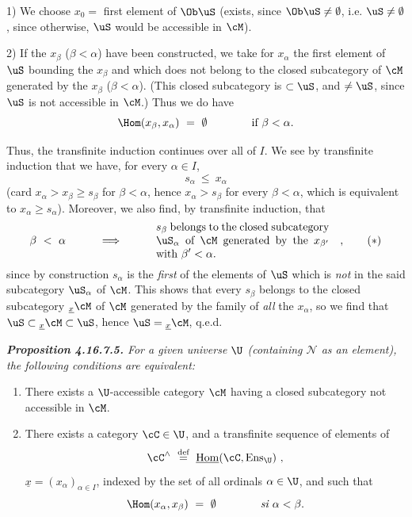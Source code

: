 1) We choose $x_0 =$ first element of $\Ob \uS$ (exists, since $\Ob \uS \neq \emptyset$, i.e. $\uS \neq \emptyset$, since otherwise, $\uS$ would be accessible in $\cM$).

2) If the $x_\beta$ ($\beta < \alpha$) have been constructed, we take for $x_\alpha$ the first element of $\uS$ bounding the $x_\beta$ and which does not belong to the closed subcategory of $\cM$ generated by the $x_\beta$ ($\beta < \alpha$). (This closed subcategory is $\subset \uS$, and $\neq \uS$, since $\uS$ is not accessible in $\cM$.) Thus we do have
\[
\Hom(x_\beta, x_\alpha) \ =\ \emptyset \qquad\qquad \text{if } \beta < \alpha.
\]


Thus, the transfinite induction continues over all of $I$. We see by transfinite induction that we have, for every $\alpha \in I$,
\[
s_\alpha \ \leqslant\ x_\alpha
\]
(card $x_\alpha > x_\beta \geqslant s_\beta$ for $\beta < \alpha$, hence $x_\alpha > s_\beta$ for every $\beta < \alpha$, which is equivalent to $x_\alpha \geqslant s_\alpha$). Moreover, we also find, by transfinite induction, that
\[
\beta \ <\ \alpha \qquad\quad \Longrightarrow \qquad\quad
\text{\parbox[c]{5.5cm}{$s_\beta$ belongs to the closed subcategory $\uS_\alpha$ of $\cM$ generated by the $x_{\beta'}$ with $\beta' < \alpha$.}}
\quad ,
\tag*{$(*)$}
\]
since by construction $s_\alpha$ is the \textit{first} of the elements of $\uS$ which is \textit{not} in the said subcategory $\uS_\alpha$ of $\cM$. This shows that every $s_\beta$ belongs to the closed subcategory ${}_{\underline{x}}\cM$ of $\cM$ generated by the family of \textit{all} the $x_\alpha$, so we find that $\uS \subset {}_{\underline{x}}\cM \subset \uS$, hence $\uS = {}_{\underline{x}}\cM$, q.e.d.

\begingroup\itshape
\noindent\textbf{\upshape Proposition 4.16.7.5.} For a given universe $\U$ (containing $\mathcal{N}$ as an element), the following conditions are equivalent:
\begin{enumerate}[label={}]
\item[1)] There exists a $\U$-accessible category $\cM$ having a closed subcategory not accessible %
in $\cM$.
\item[b)] There exists a category $\cC \in \U$, and a transfinite sequence of elements of
\[
\cC^\wedge \ \overset{\text{\upshape def}}{=}\ \underline{\mathrm{Hom}}(\cC, \mathrm{Ens}_{\U}) \ ,
\]
$\underline{x} = (x_\alpha)_{\alpha\in I}$, indexed by the set of all ordinals $\alpha \in \U$, and such that
\[
\Hom(x_\alpha, x_\beta) \ =\ \emptyset \qquad\qquad \textit{si } \alpha < \beta.
\]
\end{enumerate}
\endgroup

